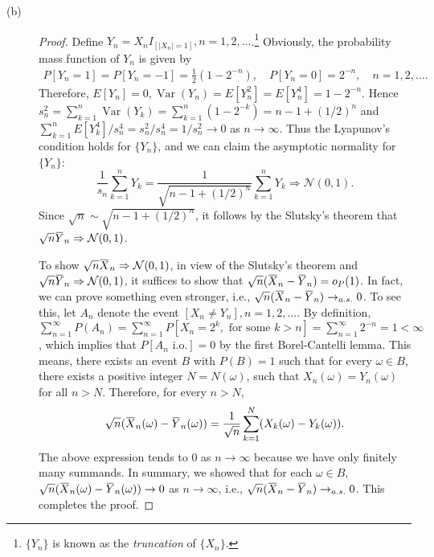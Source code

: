 \documentclass{article}
\newcommand{\overbar}[1]{\mkern 1.5mu\overline{\mkern-1.5mu#1\mkern-1.5mu}\mkern 1.5mu}
\newcommand{\gaussian}{\mathcal{N}}
\DeclareMathOperator*{\Var}{Var}
\theoremstyle{definition}
\theoremstyle{plain}
\theoremstyle{remark}
\begin{document}
\begin{description}
\begin{description}
\item[(b)] 
\begin{proof}
Define $Y_n = X_n I_{[|X_n| = 1]}, n = 1, 2, \ldots$.\footnote{$\{Y_n\}$
is known as the \emph{truncation} of $\{X_n\}$.} Obviously, the probability mass
function of $Y_n$ is given by 
\begin{align*}
    P[Y_n = 1] = P[Y_n = -1] = \frac{1}{2}(1 - 2^{-n}), \quad
    P[Y_n = 0] = 2^{-n}, \quad n = 1, 2, \ldots.
\end{align*}
Therefore, $E[Y_n] = 0, \Var(Y_n) = E[Y_n^2] = E[Y_n^4] = 1 - 2^{-n}$. Hence
$s_n^2 = \sum\limits_{k = 1}^n \Var(Y_k) = \sum\limits_{k = 1}^n (1 - 2^{-k}) 
= n - 1 + (1/2)^n$ and $\sum\limits_{k = 1}^n E[Y_k^4] / s_n^4 = s_n^2 / s_n^4 =
1 / s_n^2 \to 0$ as $n \to \infty$. Thus the Lyapunov's condition holds for 
$\{Y_n\}$, and we can claim the asymptotic normality for $\{Y_n\}$:
\begin{equation*}
    \frac{1}{s_n}\sum_{k = 1}^n Y_k = \frac{1}{\sqrt{n - 1 + (1/2)^n}}
    \sum_{k = 1}^n Y_k \Rightarrow \gaussian(0, 1).
\end{equation*}
Since $\sqrt{n} \sim \sqrt{n - 1 + (1/2)^n}$, it follows by the Slutsky's theorem
that $\sqrt{n}\overbar{Y}_n \Rightarrow \gaussian(0, 1)$. 

To show $\sqrt{n}\overbar{X}_n \Rightarrow \gaussian(0, 1)$, in view of the 
Slutsky's theorem and $\sqrt{n}\overbar{Y}_n \Rightarrow \gaussian(0, 1)$, it 
suffices to show that $\sqrt{n}(\overbar{X}_n - \overbar{Y}_n) = o_P(1)$. In fact,
we can prove something even stronger, i.e., $\sqrt{n}(\overbar{X}_n -
\overbar{Y}_n) \to_{a.s.} 0$. To see this, let $A_n$ denote the event $[X_n \neq 
Y_n], n = 1, 2, \ldots$. By definition, $\sum\limits_{n = 1}^\infty P(A_n) = 
\sum\limits_{n = 1}^\infty P[X_n = 2^k, \text{ for some } k > n] = 
\sum\limits_{n = 1}^\infty 2^{-n} = 1 < \infty$, which implies that $P[A_n 
\text{ i.o.}] = 0$ by the first Borel-Cantelli lemma. This means, there exists an
event $B$ with $P(B) = 1$ such that for every $\omega \in B$, there exists a 
positive integer $N = N(\omega)$, such that $X_n(\omega) = Y_n(\omega)$ for 
all $n > N$. Therefore, for every $n > N$, 
\begin{equation*}
    \sqrt{n}(\overbar{X}_n(\omega) - \overbar{Y}_n(\omega)) = 
    \frac{1}{\sqrt{n}}\sum_{k = 1}^N (X_k(\omega) - Y_k(\omega)).
\end{equation*}
The above expression tends to $0$ as $n \to \infty$ because we have only finitely 
many summands. In summary, we showed that for each $\omega \in B$, 
$\sqrt{n}(\overbar{X}_n(\omega) - \overbar{Y}_n(\omega)) \to 0$ as $n \to \infty$,
i.e., $\sqrt{n}(\overbar{X}_n - \overbar{Y}_n) \to_{a.s.} 0$. This completes the 
proof. 
\end{proof}
\end{description}


\end{description}
\end{document}
